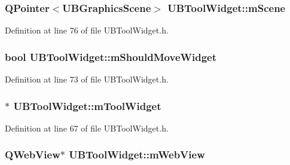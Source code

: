 \hypertarget{class_u_b_tool_widget_a4bce41d7e4b1c4fb4ac9e9c6c9b7b018}{
\subsubsection[{m\-Scene}]{\setlength{\rightskip}{0pt plus 5cm}Q\-Pointer$<${\bf U\-B\-Graphics\-Scene}$>$ U\-B\-Tool\-Widget\-::m\-Scene\hspace{0.3cm}{\ttfamily [protected]}}}\label{dc/de3/class_u_b_tool_widget_a4bce41d7e4b1c4fb4ac9e9c6c9b7b018}


Definition at line 76 of file U\-B\-Tool\-Widget.\-h.

\hypertarget{class_u_b_tool_widget_a3cb3060f6d7a0f0ee521af8c55a90536}{
\subsubsection[{m\-Should\-Move\-Widget}]{\setlength{\rightskip}{0pt plus 5cm}bool U\-B\-Tool\-Widget\-::m\-Should\-Move\-Widget\hspace{0.3cm}{\ttfamily [protected]}}}\label{dc/de3/class_u_b_tool_widget_a3cb3060f6d7a0f0ee521af8c55a90536}


Definition at line 73 of file U\-B\-Tool\-Widget.\-h.

\hypertarget{class_u_b_tool_widget_adeda56949b7ea896deaf91eb0da771aa}{
\subsubsection[{m\-Tool\-Widget}]{$\ast$ U\-B\-Tool\-Widget\-::m\-Tool\-Widget\hspace{0.3cm}{\ttfamily [protected]}}}\label{dc/de3/class_u_b_tool_widget_adeda56949b7ea896deaf91eb0da771aa}


Definition at line 67 of file U\-B\-Tool\-Widget.\-h.

\hypertarget{class_u_b_tool_widget_aa598afa73c217e3eb4842e18835e92d9}{
\subsubsection[{m\-Web\-View}]{\setlength{\rightskip}{0pt plus 5cm}Q\-Web\-View$\ast$ U\-B\-Tool\-Widget\-::m\-Web\-View\hspace{0.3cm}{\ttfamily [protected]}}}\label{dc/de3/class_u_b_tool_widget_aa598afa73c217e3eb4842e18835e92d9}


